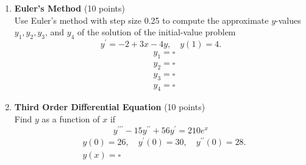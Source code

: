 \begin{enumerate}
  \item \textbf{Euler's Method} (10 points)\\
  Use Euler's method with step size 0.25 to compute the approximate $y$-values $y_1, y_2, y_3$, and $y_4$ of the solution of the initial-value problem
  $$
  y^{\prime}=-2+3 x-4 y, \quad y(1)=4 .
  $$
  $$
  \begin{aligned}
  & y_1=\square \\
  & y_2=\square \\
  & y_3=\square \\
  & y_4=\square
  \end{aligned}
  $$
  \begin{subanswer}
  \end{subanswer}

  \item \textbf{Third Order Differential Equation} (10 points)\\
  Find $y$ as a function of $x$ if
  $$
  y^{\prime \prime \prime}-15 y^{\prime \prime}+56 y^{\prime}=210 e^x
  $$
  $$
  \begin{aligned}
  & y(0)=26, \quad y^{\prime}(0)=30, \quad y^{\prime \prime}(0)=28 . \\
  & y(x)=\square
  \end{aligned}
  $$
  \begin{subanswer}
  \end{subanswer}


\end{enumerate}
